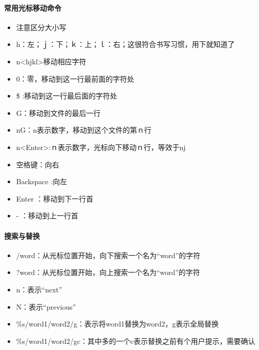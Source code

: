 \paragraph{常用光标移动命令}
\begin{itemize}
\item {\color{red}注意区分大小写}
\item h：左；ｊ：下；ｋ：上；ｌ：右；这很符合书写习惯，用下就知道了
\item n<hjkl>移动相应字符
\item 0：零，移动到这一行最前面的字符处
\item \$ :移动到这一行最后面的字符处
\item G：移动到文件的最后一行
\item nG：n表示数字，移动到这个文件的第ｎ行
\item n<Enter>:ｎ表示数字，光标向下移动ｎ行，等效于nj
\item 空格键：向右
\item Backspace :向左
\item Enter ：移动到下一行首
\item - ：移动到上一行首
\end{itemize}


\paragraph{搜索与替换}
\begin{itemize}
\item /word：从光标位置开始，向下搜索一个名为“word”的字符
\item ?word：从光标位置开始，向上搜索一个名为“word”的字符
\item n：表示“next”
\item N：表示“previous”
\item \%s/word1/word2/g：表示将word1替换为word2，g表示全局替换
\item \%s/word1/word2/gc：其中多的一个c表示替换之前有个用户提示，需要确认
\end{itemize}


